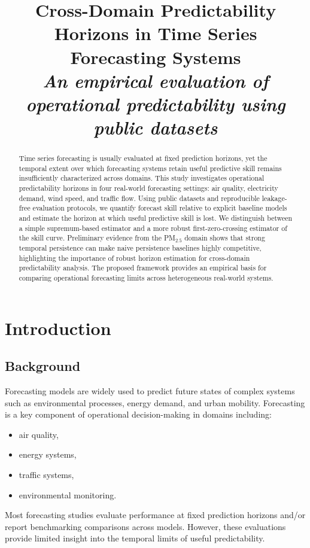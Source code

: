 \documentclass[11pt]{article}
\title{Cross-Domain Predictability Horizons in Time Series Forecasting Systems\\
\large\emph{An empirical evaluation of operational predictability using public datasets}}
\author{}
\date{}
\begin{document}
\maketitle

\begin{abstract}
Time series forecasting is usually evaluated at fixed prediction horizons, yet the temporal extent over which forecasting systems retain useful predictive skill remains insufficiently characterized across domains.
This study investigates operational predictability horizons in four real-world forecasting settings: air quality, electricity demand, wind speed, and traffic flow.
Using public datasets and reproducible leakage-free evaluation protocols, we quantify forecast skill relative to explicit baseline models and estimate the horizon at which useful predictive skill is lost.
We distinguish between a simple supremum-based estimator and a more robust first-zero-crossing estimator of the skill curve.
Preliminary evidence from the PM$_{2.5}$ domain shows that strong temporal persistence can make naive persistence baselines highly competitive, highlighting the importance of robust horizon estimation for cross-domain predictability analysis.
The proposed framework provides an empirical basis for comparing operational forecasting limits across heterogeneous real-world systems.
\end{abstract}

\section{Introduction}

\subsection{Background}
Forecasting models are widely used to predict future states of complex systems such as environmental processes, energy demand, and urban mobility. Forecasting is a key component of operational decision-making in domains including:
\begin{itemize}
  \item air quality,
  \item energy systems,
  \item traffic systems,
  \item environmental monitoring.
\end{itemize}
Most forecasting studies evaluate performance at fixed prediction horizons and/or report benchmarking comparisons across models. However, these evaluations provide limited insight into the temporal limits of useful predictability.
\end{document}
